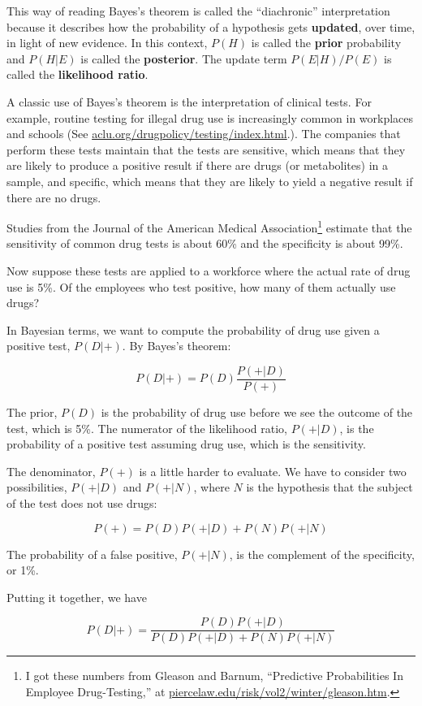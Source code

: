 \documentclass[12pt]{book}
\begin{document}
This way of reading Bayes's theorem is called the ``diachronic''
interpretation because it describes how the probability of a
hypothesis gets {\bf updated}, over time, in light of new evidence.
In this context, $P(H)$ is called the {\bf prior} probability and
$P(H|E)$ is called the {\bf posterior}.  The update term $P(E|H)/P(E)$
is called the {\bf likelihood ratio}.

A classic use of Bayes's theorem is the interpretation of clinical
tests.  For example, routine testing for illegal drug use is
increasingly common in workplaces and schools (See
\url{aclu.org/drugpolicy/testing/index.html}.).  The companies that
perform these tests maintain that the tests are sensitive, which means
that they are likely to produce a positive result if there are drugs
(or metabolites) in a sample, and specific, which means that they are
likely to yield a negative result if there are no drugs.

Studies from the Journal of the American Medical
Association\footnote{I got these numbers from Gleason and Barnum,
  ``Predictive Probabilities In Employee Drug-Testing,'' at
  \url{piercelaw.edu/risk/vol2/winter/gleason.htm}.} estimate that
the sensitivity of common drug tests is about 60\% and the specificity
is about 99\%.

Now suppose these tests are applied to a workforce where the
actual rate of drug use is 5\%.  Of the employees who test positive,
how many of them actually use drugs?

In Bayesian terms, we want to compute the probability of
drug use given a positive test, $P(D|+)$.  By Bayes's theorem:

\[ P(D|+) = P(D) \frac{P(+|D)}{P(+)} \]

The prior, $P(D)$ is the probability of drug use before we
see the outcome of the test, which is 5\%.
The numerator of the likelihood ratio, $P(+|D)$, is the probability
of a positive test assuming drug use, which is the sensitivity.

The denominator, $P(+)$ is a little harder to evaluate.  We have to
consider two possibilities, $P(+|D)$ and $P(+|N)$, where $N$ is the
hypothesis that the subject of the test does not use drugs:

\[ P(+) = P(D) P(+|D) + P(N) P(+|N) \]

The probability of a false positive, $P(+|N)$, is the complement
of the specificity, or 1\%.

Putting it together, we have

\[ P(D|+) = \frac{P(D) P(+|D)}{P(D) P(+|D) + P(N) P(+|N)}\]
\end{document}
